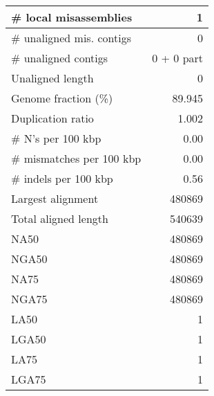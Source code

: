 \documentclass[12pt,a4paper]{article}
\begin{document}
\begin{table}[ht]
\begin{center}
\begin{tabular}{|l*{1}{|r}|}
\# local misassemblies & 1 \\ \hline
\# unaligned mis. contigs & 0 \\ \hline
\# unaligned contigs & 0 + 0 part \\ \hline
Unaligned length & 0 \\ \hline
Genome fraction (\%) & 89.945 \\ \hline
Duplication ratio & 1.002 \\ \hline
\# N's per 100 kbp & 0.00 \\ \hline
\# mismatches per 100 kbp & 0.00 \\ \hline
\# indels per 100 kbp & 0.56 \\ \hline
Largest alignment & 480869 \\ \hline
Total aligned length & 540639 \\ \hline
NA50 & 480869 \\ \hline
NGA50 & 480869 \\ \hline
NA75 & 480869 \\ \hline
NGA75 & 480869 \\ \hline
LA50 & 1 \\ \hline
LGA50 & 1 \\ \hline
LA75 & 1 \\ \hline
LGA75 & 1 \\ \hline
\end{tabular}
\end{center}
\end{table}
\end{document}

